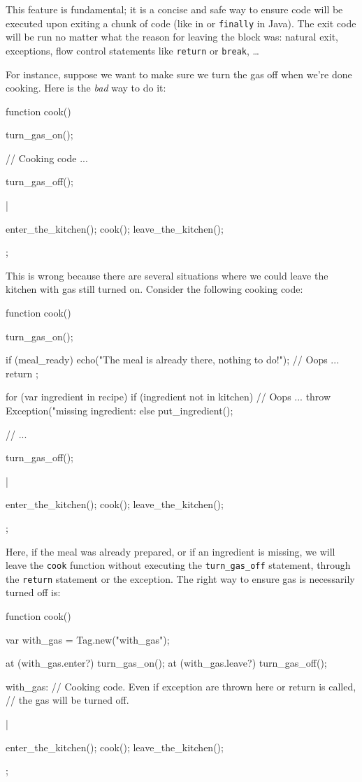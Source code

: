 This feature is fundamental; it is a concise and safe way to ensure
code will be executed upon exiting a chunk of code (like
 in \Cxx or \lstinline|finally| in Java). The exit code
will be run no matter what the reason for leaving the block was:
natural exit, exceptions, flow control statements like
\lstinline|return| or \lstinline|break|, \ldots

For instance, suppose we want to make sure we turn the gas off when
we're done cooking. Here is the \emph{bad} way to do it:

\begin{urbiscript}
{
  function cook()
  {
    turn_gas_on();

    // Cooking code ...

    turn_gas_off();
  }|

  enter_the_kitchen();
  cook();
  leave_the_kitchen();
};
\end{urbiscript}

This is wrong because there are several situations where we could leave
the kitchen with gas still turned on. Consider the following cooking
code:

\begin{urbiscript}
{
  function cook()
  {
    turn_gas_on();

    if (meal_ready)
    {
      echo("The meal is already there, nothing to do!");
      // Oops ...
      return
    };

    for (var ingredient in recipe)
      if (ingredient not in kitchen)
        // Oops ...
        throw Exception("missing ingredient: %
      else
        put_ingredient();

    // ...

    turn_gas_off();
  }|

  enter_the_kitchen();
  cook();
  leave_the_kitchen();
};
\end{urbiscript}

Here, if the meal was already prepared, or if an
ingredient is missing, we will leave the \lstinline|cook| function
without executing the \lstinline|turn_gas_off| statement, through the
\lstinline|return| statement or the exception. The right way to ensure
gas is necessarily turned off is:

\begin{urbiscript}
{
  function cook()
  {
    var with_gas = Tag.new("with_gas");

    at (with_gas.enter?)
      turn_gas_on();
    at (with_gas.leave?)
      turn_gas_off();

    with_gas: {
      // Cooking code. Even if exception are thrown here or return is called,
      // the gas will be turned off.
    }
  }|

  enter_the_kitchen();
  cook();
  leave_the_kitchen();
};
\end{urbiscript}

